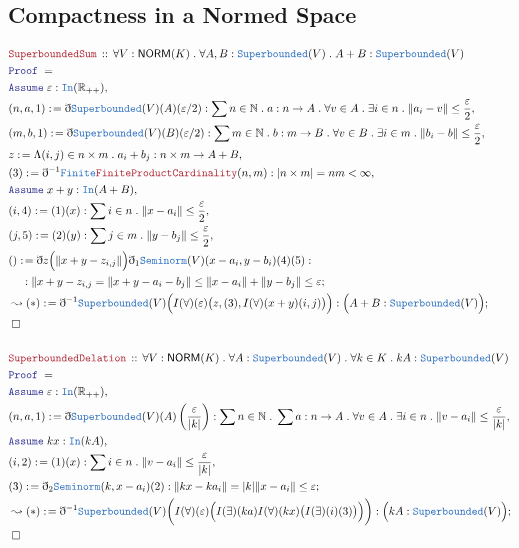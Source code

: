 \documentclass[12pt]{scrartcl}
\newcommand{\TYPE}[1]{\textcolor{NavyBlue}{\mathtt{#1}}}
\newcommand{\LOGIC}[1]{\textcolor{Blue}{\mathtt{#1}}}
\newcommand{\THM}[1]{\textcolor{Maroon}{\mathtt{#1}}}
\renewcommand{\.}{\; . \;}
\newcommand{\de}{: \kern 0.1pc =}
\newcommand{\Theorem}[2]{& \THM{#1} \, :: \, #2 \\ & \Proof = \\ }
\newcommand{\NewLine}{\\ & \kern 1pc}
\newcommand{\Page}[1]{\begin{align*} #1 \end{align*} \newpage   }
\newcommand{ \bd }{ \ByDef }
\newcommand{\Reals}{\mathbb{R} }
\newcommand{\Nat}{\mathbb{N} }
\newcommand{\Say}[3]{& #1 \de #2 : #3, \\}
\newcommand{\Conclude}[3]{& #1 \de #2 : #3; \\}
\newcommand{\DeriveConclude}[3]{& \leadsto #1 \de #2 : #3 ; \\}
\newcommand{\A}{\LOGIC{Assume} \;}
\newcommand{\Assume}[2]{& \A #1 : #2, \\}
\newcommand{\QED}{\; \square}
\newcommand{\EndProof}{& \QED \\}
\newcommand{\ByDef}{\eth}
\newcommand{\Proof}{\LOGIC{Proof} \; }
\newcommand{\SB}{\TYPE{Superbounded}}
\newcommand{\NORM}{\mathsf{NORM}} %
\begin{document}
\subsection{Compactness in a Normed Space}
\Page{
  \Theorem{SuperboundedSum}{\forall V : \NORM(K) \. \forall A,B : \SB(V) \. A + B : \SB(V)}
  \Assume{\varepsilon}{\TYPE{In}(\Reals_{++})}
  \Say{(n,a,1)}{\bd \SB(V)(A)(\varepsilon/2)}{\sum n \in \Nat \. a : n \to A \. \forall v \in A \. \exists i \in n \.
  \| a_i - v \| \le \frac{\varepsilon}{2}}
  \Say{(m,b,1)}{ \bd \SB(V)(B) (\varepsilon/2)}{\sum m \in \Nat \. b : m \to B \. \forall v \in B \. \exists i \in m \.
  \| b_i - b \| \le \frac{\varepsilon}{2}}
  \Say{z}{ \Lambda (i,j) \in n \times m \. a_i + b_j  }{ n \times m \to A + B  }
  \Say{(3)}{ \bd^{-1} \TYPE{Finite} \THM{FiniteProductCardinality}(n,m) }{ | n \times m | = nm < \infty }
  \Assume{x + y}{ \TYPE{In}(A + B) }
  \Say{(i,4)}{(1)(x)}{ \sum i \in n \. \| x - a_i \| \le \frac{\varepsilon}{2}}
  \Say{(j,5)}{(2)(y)}{\sum j \in m \. \|y - b_j \| \le \frac{\varepsilon}{2}}
  \Conclude{()}{ \bd z \Big( \| x + y - z_{i,j} \| \Big) \bd_1 \TYPE{Seminorm}(V)(x - a_i, y - b_i)(4)(5)  }
  { 
  \NewLine :
  \| x + y - z_{i,j} = \| x + y - a_i - b_j\| \le \| x - a_i\| + \| y - b_j\| \le \varepsilon}
  \DeriveConclude{(*)}{ \bd^{-1} \SB(V) \Big( I(\forall)(\varepsilon)\big( z, (3), I(\forall)(x + y)(i,j)\big)\Big)}{
	  \Big( A + B : \SB(V)  \Big)
  }
  \EndProof
  \\
  \Theorem{SuperboundedDelation}{\forall V : \NORM(K) \. \forall A : \SB(V) \. \forall k \in K \. kA : \SB(V)}
  \Assume{\varepsilon}{\TYPE{In}(\Reals_{++})}
  \Say{(n,a,1)}{\bd \SB(V)(A)\left( \frac{\varepsilon}{|k|} \right)}
  {\sum n \in \Nat \. \sum a : n \to A \. \forall v \in A \. \exists i \in n \. \| v - a_i \| \le \frac{\varepsilon}{|k|}  }
  \Assume{kx}{\TYPE{In}(kA)}
  \Say{(i,2)}{ (1)(x)}{ \sum i \in n \. \| v - a_i \| \le \frac{\varepsilon}{|k|}}
  \Conclude{(3)}{ \bd_2 \TYPE{Seminorm}( k, x - a_i )(2) }{\| kx - ka_i \| = |k| \| x - a_i \| \le \varepsilon}
  \DeriveConclude{(*)}{ \bd^{-1} \SB(V) \bigg( I(\forall)(\varepsilon)\Big( I(\exists)(ka)I(\forall)(kx)\big( I(\exists)(i)(3)  \big) \Big) \bigg)  }
  { \Big( kA : \SB(V)  \Big) }
  \EndProof
}
\end{document}
